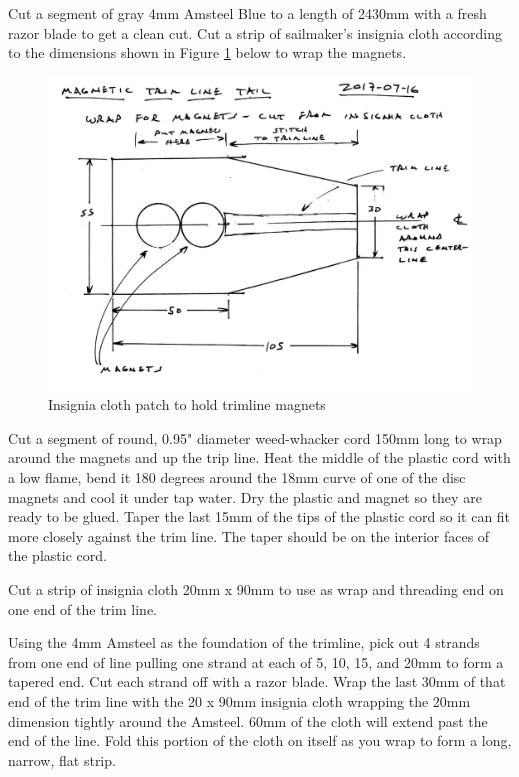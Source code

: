 \documentclass[]{book}
\begin{document}
Cut a segment of gray 4mm Amsteel Blue to a length of 2430mm with a fresh razor blade to get a clean cut. Cut a strip of sailmaker's insignia cloth according to the dimensions shown in Figure \ref{fig:magnet-wrap} below to wrap the magnets.

\begin{figure}

{\centering \includegraphics[width=0.7\linewidth]{images/magnetic_trimline_tails_9} 

}

\caption{Insignia cloth patch to hold trimline magnets}\label{fig:magnet-wrap}
\end{figure}

Cut a segment of round, 0.95" diameter weed-whacker cord 150mm long to wrap around the magnets and up the trip line. Heat the middle of the plastic cord with a low flame, bend it 180 degrees around the 18mm curve of one of the disc magnets and cool it under tap water. Dry the plastic and magnet so they are ready to be glued. Taper the last 15mm of the tips of the plastic cord so it can fit more closely against the trim line. The taper should be on the interior faces of the plastic cord.

Cut a strip of insignia cloth 20mm x 90mm to use as wrap and threading end on one end of the trim line.

Using the 4mm Amsteel as the foundation of the trimline, pick out 4 strands from one end of line pulling one strand at each of 5, 10, 15, and 20mm to form a tapered end. Cut each strand off with a razor blade. Wrap the last 30mm of that end of the trim line with the 20 x 90mm insignia cloth wrapping the 20mm dimension tightly around the Amsteel. 60mm of the cloth will extend past the end of the line. Fold this portion of the cloth on itself as you wrap to form a long, narrow, flat strip.
\end{document}
